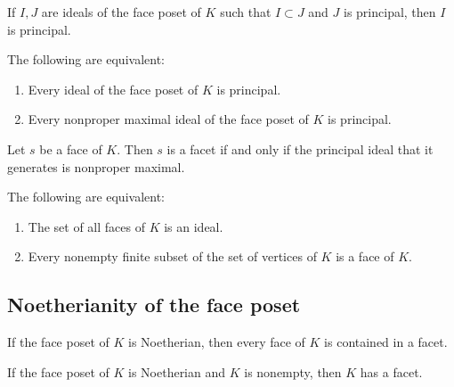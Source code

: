 \begin{sublemma}
If $I,J$ are ideals of the face poset of $K$ such that $I\subset J$ and $J$ is principal, then $I$ is principal.

\end{sublemma}

\begin{sublemma}
The following are equivalent:
\begin{enumerate}
\item Every ideal of the face poset of $K$ is principal.
\item Every nonproper maximal ideal of the face poset of $K$ is principal.


\end{enumerate}
\end{sublemma}

\begin{sublemma}
Let $s$ be a face of $K$. Then $s$ is a facet if and only if the principal ideal that it generates is nonproper maximal.

\end{sublemma}

\begin{sublemma}
The following are equivalent:
\begin{enumerate}
\item The set of all faces of $K$ is an ideal.
\item Every nonempty finite subset of the set of vertices of $K$ is a face of $K$.

\end{enumerate}
\end{sublemma}


\subsection{Noetherianity of the face poset}

\begin{sublemma}
If the face poset of $K$ is Noetherian, then every face of $K$ is contained in a facet.

\end{sublemma}

\begin{sublemma}
If the face poset of $K$ is Noetherian and $K$ is nonempty, then $K$ has a facet. 

\end{sublemma}

